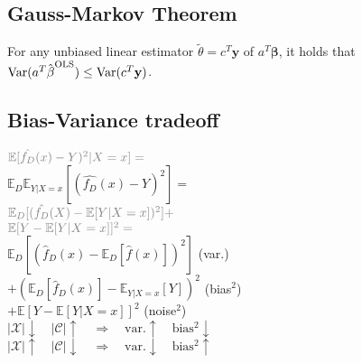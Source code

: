 \subsection*{Gauss-Markov Theorem}
For any unbiased linear estimator $\tilde{\theta} = c^T\mathbf{y}$ of $a^T\mathbf{\beta}$, it holds that $\mathrm{Var}(a^T\hat{\kern0pt \beta}^{\mathrm{OLS}}) \leq \mathrm{Var}(c^T\mathbf{y})$.

\subsection*{Bias-Variance tradeoff}
$\color{gray}\mathbb{E}[\hat{f_D}(x)-Y)^2|X=x]=$\\
$\mathbb{E}_D\mathbb{E}_{Y|X=x}[(\hat{f_D}(x)-Y)^2]=$\\
$\color{gray}\mathbb{E}_D[(\hat{f_D}(X)-\mathbb{E}[Y|X=x])^2]+$\\$\color{gray}\mathbb{E}[Y-\mathbb{E}[Y|X=x]]^2=$\\
$\mathbb{E}_D[(\hat{f}_D(x)-\mathbb{E}_D[\hat{f}(x)])^2]$ (var.)\\
$+(\mathbb{E}_D[\hat{f}_D(x)]-\mathbb{E}_{Y|X=x}[Y])^2$ (bias$^2$)\\
$+\mathbb{E}[Y-\mathbb{E}[Y|X=x]]^2$ (noise$^2$)\\

$|\mathcal{X}|\downarrow \quad|\mathcal{C}|\uparrow\quad\Rightarrow\quad\mathrm{var.}\uparrow\quad\mathrm{bias^2}\downarrow $\\
$|\mathcal{X}|\uparrow \quad|\mathcal{C}|\downarrow\quad\Rightarrow\quad\mathrm{var.}\downarrow\quad\mathrm{bias^2}\uparrow $
